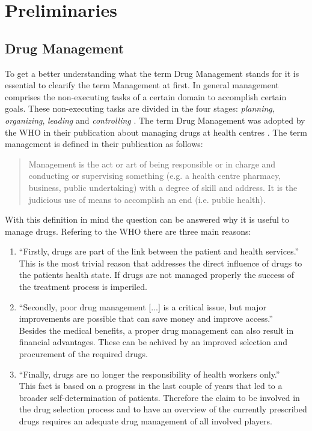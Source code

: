 \chapter{Preliminaries}
\label{cha:prelims}

\section{Drug Management}
\label{sec:drug-management}

To get a better understanding what the term Drug Management stands for it is essential to clearify the term Management at first.
In general management comprises the non-executing tasks of a certain domain to accomplish certain goals.
These non-executing tasks are divided in the four stages: \textit{planning}, \textit{organizing}, \textit{leading} and \textit{controlling} \cite{robbins2007fundamentals}.
The term Drug Management was adopted by the WHO in their publication about managing drugs at health centres \cite{who2004}.
The term management is defined in their publication as follows: 
\begin{quote}
  Management is the act or art of being responsible or in charge and conducting or supervising something (e.g. a health centre pharmacy, business, public undertaking) with a degree of skill and address. It is the judicious use of means to accomplish an end (i.e. public health).
\end{quote}
With this definition in mind the question can be answered why it is useful to manage drugs.
Refering to the WHO there are three main reasons:
\begin{enumerate}
\item ``Firstly, drugs are part of the link between the patient and health services.''\\
  This is the most trivial reason that addresses the direct influence of drugs to the patients health state. If drugs are not managed properly the success of the treatment process is imperiled. 
\item ``Secondly, poor drug management [...] is a critical issue, but major improvements are possible that can save money and improve access.''\\
  Besides the medical benefits, a proper drug management can also result in financial advantages. These can be achived by an improved selection and procurement of the required drugs.
\item ``Finally, drugs are no longer the responsibility of health workers only.''\\
  This fact is based on a progress in the last couple of years that led to a broader self-determination of patients. 
  Therefore the claim to be involved in the drug selection process and to have an overview of the currently prescribed drugs requires an adequate drug management of all involved players.
\end{enumerate}
